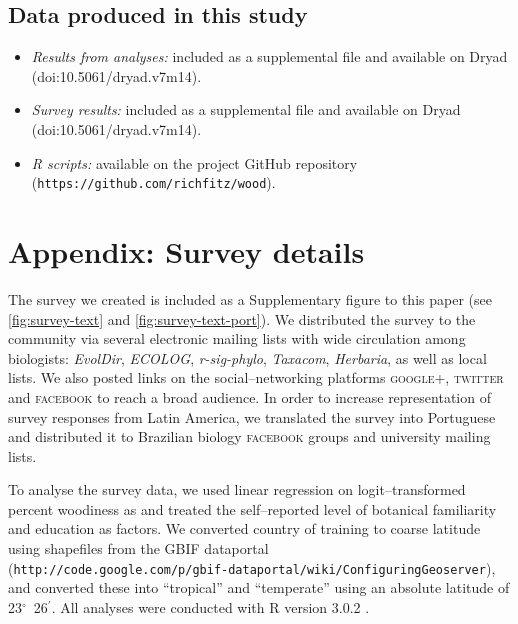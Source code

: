 \documentclass[a4paper,12pt]{article}
\begin{document}
\subsection{Data produced in this study}
\begin{itemize}
\item \textit{Results from analyses:} included as a supplemental file
  and available on Dryad (doi:10.5061/dryad.v7m14).
\item \textit{Survey results:} included as a supplemental file and
  available on Dryad (doi:10.5061/dryad.v7m14).
\item \textit{R scripts:} available on the project GitHub repository
  (\texttt{https://github.com/richfitz/wood}).
\end{itemize}


\section{Appendix: Survey details}
%
The survey we created is included as a Supplementary figure to
this paper (see \ref{fig:survey-text} and \ref{fig:survey-text-port}).
We distributed the survey to the 
community via several electronic
mailing lists with wide circulation among biologists: \emph{EvolDir},
\emph{ECOLOG}, \emph{\mbox{r-sig-phylo}}, \emph{Taxacom},
\emph{Herbaria}, as well as local lists. We also posted links on the
social--networking platforms \textsc{google+}, \textsc{twitter} and
\textsc{facebook} to reach a broad audience.
%
In order to increase representation of survey responses from Latin
America, we translated the survey into Portuguese and distributed it
to Brazilian biology \textsc{facebook} groups and university mailing
lists.

To analyse the survey data, we used linear regression on
logit--transformed percent woodiness as \citep[see][]{wartonarcsine}
and treated the self--reported level of botanical familiarity and
education as factors.  We converted country of training to coarse
latitude using shapefiles
from the GBIF dataportal\\
(\texttt{http://code.google.com/p/gbif-dataportal/wiki/ConfiguringGeoserver}),
and converted these into ``tropical'' and ``temperate'' using an
absolute latitude of 23$^\circ$~26$^\prime$.  All analyses were
conducted with R version 3.0.2 \citep{R}.




\end{document}
